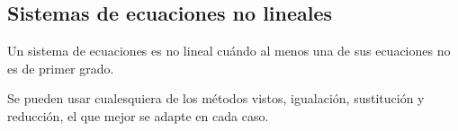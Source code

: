 \vspace{.5cm}
\subsection{Sistemas de ecuaciones no lineales}
\vspace{0.5cm}

\begin{definition}

Un sistema de ecuaciones es no lineal cuándo al menos una de sus ecuaciones no es de primer grado.	

\begin{theorem}

Se pueden usar cualesquiera de los métodos vistos, igualación, sustitución y reducción, el que mejor se adapte en cada caso.	
\end{theorem}

\end{definition}


